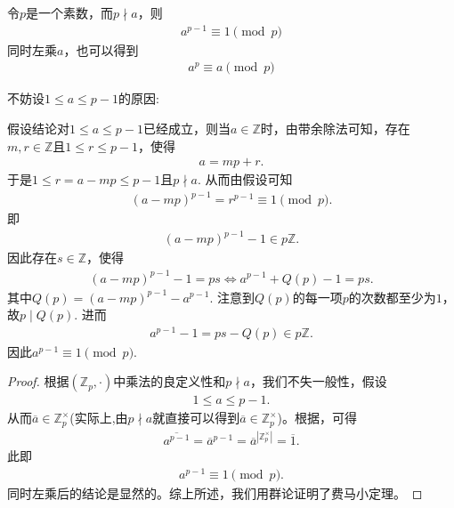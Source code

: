\documentclass[../../main.tex]{subfiles}
\begin{document}
\begin{theorem}[Fermat小定理]\label{theorem:Fermat小定理}
令$p$是一个素数，而$p \nmid a$，则
\begin{align*}
a^{p - 1} \equiv 1 \pmod{p}
\end{align*}
同时左乘$a$，也可以得到
\begin{align*}
a^{p} \equiv a \pmod{p}
\end{align*}
\end{theorem}
\begin{note}
不妨设$1 \leqslant a \leqslant p - 1$的原因:

假设结论对$1 \leqslant a \leqslant p - 1$已经成立，则当$a \in \mathbb{Z}$时，由带余除法可知，存在$m, r \in \mathbb{Z}$且$1 \leqslant r \leqslant p - 1$，使得
\begin{align*}
a = mp + r.
\end{align*}
于是$1 \leqslant r = a - mp \leqslant p - 1$且$p \nmid a$. 从而由假设可知
\begin{align*}
(a - mp)^{p - 1} = r^{p - 1} \equiv 1 \pmod{p}.
\end{align*}
即
\begin{align*}
(a - mp)^{p - 1} - 1 \in p\mathbb{Z}.
\end{align*}
因此存在$s \in \mathbb{Z}$，使得
\begin{align*}
(a - mp)^{p - 1} - 1 = ps \iff a^{p - 1} + Q(p) - 1 = ps.
\end{align*}
其中$Q(p) = (a - mp)^{p - 1} - a^{p - 1}$. 注意到$Q(p)$的每一项$p$的次数都至少为$1$，故$p \mid Q(p)$. 进而
\begin{align*}
a^{p - 1} - 1 = ps - Q(p) \in p\mathbb{Z}.
\end{align*}
因此$a^{p - 1} \equiv 1 \pmod{p}$. 
\end{note}
\begin{proof}
根据$(\mathbb{Z}_p, \cdot)$中乘法的良定义性和$p \nmid a$，我们不失一般性，假设
\begin{align*}
1 \leqslant a \leqslant p - 1.
\end{align*}
从而$\overline{a} \in \mathbb{Z}_p^\times$(实际上,由$p \nmid a$就直接可以得到$\overline{a} \in \mathbb{Z}_p^\times$)。根据，可得
\begin{align*}
\overline{a^{p-1}}=\overline{a}^{p-1}=\overline{a}^{|\mathbb{Z}_p^\times|} = \overline{1}.
\end{align*}
此即
\begin{align*}
a^{p - 1} \equiv 1 \pmod{p}.
\end{align*}
同时左乘后的结论是显然的。综上所述，我们用群论证明了费马小定理。 
\end{proof}
\end{document}
